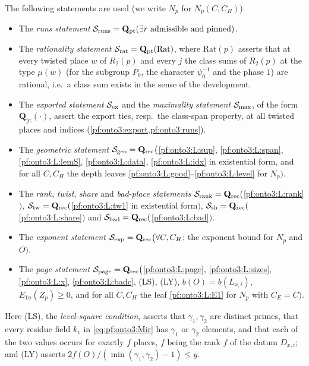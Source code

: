 \begin{definition}\label{pf:onto3:recstmts}
The following statements are used (we write $N_p$ for $N_p(C,C_H)$).
\begin{itemize}
\item The \emph{runs statement} $\mathcal{S}_{\mathrm{runs}}=\mathbf Q_{\mathrm{pt}}(\exists r\text{ admissible and pinned})$.
\item The \emph{rationality statement} $\mathcal{S}_{\mathrm{rat}}=\mathbf Q_{\mathrm{pt}}(\mathrm{Rat})$, where
$\mathrm{Rat}(p)$ asserts that at every twisted place $w$ of $R_2(p)$ and every $j$ the class sums of $R_2(p)$ at the
type $\mu(w)$ (for the subgroup $P_0$, the character $\psi_0^{-1}$ and the phase $1$) are rational, i.e.\ a class
sum exists in the sense of the development.
\item The \emph{exported statement} $\mathcal{S}_{\mathrm{ex}}$ and the \emph{maximality statement} $\mathcal{S}_{\mathrm{max}}$,
of the form $\mathbf Q_{\mathrm{pt}}(\cdot)$, assert the export ties, resp.\ the class-span property, at all twisted
places and indices (\cref{pf:onto3:export,pf:onto3:runs}).
\item The \emph{geometric statement} $\mathcal{S}_{\mathrm{geo}}=\mathbf Q_{\mathrm{rec}}\bigl($\ref{pf:onto3:L:sup},
\ref{pf:onto3:L:span}, \ref{pf:onto3:L:lemS}, \ref{pf:onto3:L:data}, \ref{pf:onto3:L:idx} in existential form,
and for all $C,C_H$ the depth leaves \ref{pf:onto3:L:good}--\ref{pf:onto3:L:level} for $N_p$$\bigr)$.
\item The \emph{rank}, \emph{twist}, \emph{share} and \emph{bad-place statements}
$\mathcal{S}_{\mathrm{rank}}=\mathbf Q_{\mathrm{rec}}($\ref{pf:onto3:L:rank}$)$,
$\mathcal{S}_{\mathrm{tw}}=\mathbf Q_{\mathrm{rec}}($\ref{pf:onto3:L:tw1} in existential form$)$,
$\mathcal{S}_{\mathrm{sh}}=\mathbf Q_{\mathrm{rec}}($\ref{pf:onto3:L:share}$)$ and
$\mathcal{S}_{\mathrm{bad}}=\mathbf Q_{\mathrm{rec}}($\ref{pf:onto3:L:bad}$)$.
\item The \emph{exponent statement} $\mathcal{S}_{\mathrm{exp}}=\mathbf Q_{\mathrm{rec}}\bigl(\forall C,C_H$: the exponent
bound for $N_p$ and $O\bigr)$.
\item The \emph{page statement} $\mathcal{S}_{\mathrm{page}}=\mathbf Q_{\mathrm{rec}}\bigl($\ref{pf:onto3:L:page},
\ref{pf:onto3:L:sizes}, \ref{pf:onto3:L:x}, \ref{pf:onto3:L:badc}, (LS), (LY), $b(O)=b(L_{x,i})$,
$E_{1u}(Z_p)\ge0$, and for all $C,C_H$ the leaf \ref{pf:onto3:L:E1} for $N_p$ with $C_E=C\bigr)$.
\end{itemize}
Here (LS), the \emph{level-square condition}, asserts that $\gamma_1,\gamma_2$ are distinct primes, that every
residue field $k_v$ in \eqref{eq:pf:onto3:Mir} has $\gamma_1$ or $\gamma_2$ elements, and that each of the two
values occurs for exactly $f$ places, $f$ being the rank $f$ of the datum $D_{x,i}$; and (LY) asserts
$2f(O)/(\min(\gamma_1,\gamma_2)-1)\le y$.
\end{definition}

